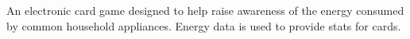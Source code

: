 \documentclass[a4paper]{deedy-resume} %
\begin{document}
\begin{minipage}[t]{0.66\textwidth}


An electronic card game designed to help raise awareness of the energy consumed by common household appliances. Energy data is used to provide stats for cards.%
\sectionspace %









\end{minipage}
\end{document}

